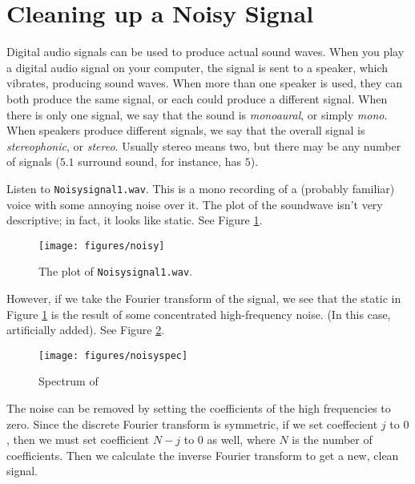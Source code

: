 

\section*{Cleaning up a Noisy Signal}

Digital audio signals can be used to produce actual sound waves.  When you play a digital audio signal on your computer, the signal is sent to
a speaker, which vibrates, producing sound waves.  When more than one speaker is used, they can both produce the same signal, or each could produce
a different signal.  When there is only one signal, we say that the sound is \emph{monoaural}, or simply \emph{mono}.  When speakers produce different
signals, we say that the overall signal is \emph{stereophonic}, or \emph{stereo}.  Usually stereo means two, but there may be any number of signals ($5.1$
surround sound, for instance, has $5$).

Listen to \texttt{Noisysignal1.wav}.
This is a mono recording of a (probably familiar) voice with some annoying noise over it.
The plot of the soundwave isn't very descriptive; in fact, it looks like static.
See Figure \ref{fig:noisysignal}.

\begin{figure}
\centering
\texttt{[image: figures/noisy]}
\caption{The plot of \texttt{Noisysignal1.wav}.}
\label{fig:noisysignal}
\end{figure}

However, if we take the Fourier transform of the signal, we see that the static in Figure \ref{fig:noisysignal} is the result of some concentrated high-frequency noise.
(In this case, artificially added).
See Figure \ref{fig:noisyspec}.

\begin{figure}
\centering
\texttt{[image: figures/noisyspec]}
\caption{Spectrum of }
\label{fig:noisyspec}
\end{figure}

The noise can be removed by setting the coefficients of the high frequencies to zero.
Since the discrete Fourier transform is symmetric, if we set coeffecient $j$ to $0$, then we must set coefficient $N - j$ to $0$ as well, where $N$ is the number of coefficients.
Then we calculate the inverse Fourier transform to get a new, clean signal.

